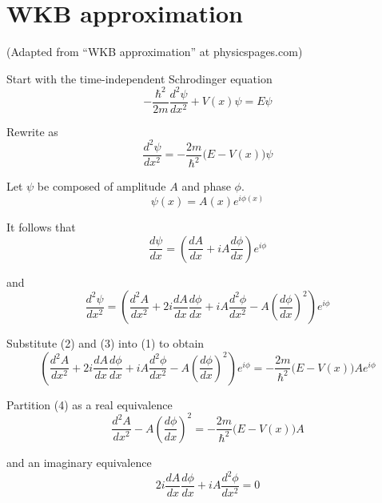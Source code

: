 

\section*{WKB approximation}

(Adapted from ``WKB approximation'' at physicspages.com)

\bigskip
Start with the time-independent Schrodinger equation
\begin{equation*}
-\frac{\hbar^2}{2m}\frac{d^2\psi}{dx^2}+V(x)\psi=E\psi
\end{equation*}

Rewrite as
\begin{equation*}
\frac{d^2\psi}{dx^2}=-\frac{2m}{\hbar^2}\bigl(E-V(x)\bigr)\psi
\tag{1}
\end{equation*}

Let $\psi$ be composed of amplitude $A$ and phase $\phi$.
\begin{equation*}
\psi(x)=A(x)e^{i\phi(x)}
\tag{2}
\end{equation*}

It follows that
\begin{equation*}
\frac{d\psi}{dx}=\left(\frac{dA}{dx}+iA\frac{d\phi}{dx}\right)e^{i\phi}
\end{equation*}

and
\begin{equation*}
\frac{d^2\psi}{dx^2}=\left(
\frac{d^2A}{dx^2}+2i\frac{dA}{dx}\frac{d\phi}{dx}
+iA\frac{d^2\phi}{dx^2}-A\left(\frac{d\phi}{dx}\right)^2
\right)e^{i\phi}
\tag{3}
\end{equation*}

Substitute (2) and (3) into (1) to obtain
\begin{equation*}
\left(
\frac{d^2A}{dx^2}+2i\frac{dA}{dx}\frac{d\phi}{dx}
+iA\frac{d^2\phi}{dx^2}-A\left(\frac{d\phi}{dx}\right)^2
\right)e^{i\phi}
=-\frac{2m}{\hbar^2}\bigl(E-V(x)\bigr)Ae^{i\phi}
\tag{4}
\end{equation*}

Partition (4) as a real equivalence
\begin{equation*}
\frac{d^2A}{dx^2}-A\left(\frac{d\phi}{dx}\right)^2
=-\frac{2m}{\hbar^2}\bigl(E-V(x)\bigr)A
\tag{5}
\end{equation*}

and an imaginary equivalence
\begin{equation*}
2i\frac{dA}{dx}\frac{d\phi}{dx}+iA\frac{d^2\phi}{dx^2}=0
\tag{6}
\end{equation*}

